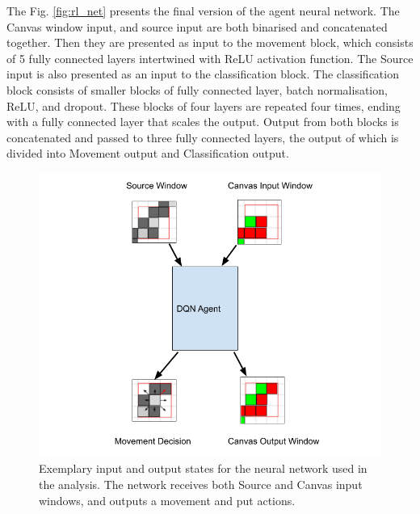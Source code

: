 The Fig. \ref{fig:rl_net} presents the final version of the agent neural network.
The Canvas window input, and source input are both binarised and concatenated together.
Then they are presented as input to the movement block, which consists of 5 fully connected layers intertwined with ReLU activation function.
The Source input is also presented as an input to the classification block.
The classification block consists of smaller blocks of fully connected layer, batch normalisation, ReLU, and dropout.
These blocks of four layers are repeated four times, ending with a fully connected layer that scales the output.
Output from both blocks is concatenated and passed to three fully connected layers, the output of which is divided into Movement output and Classification output.

\begin{figure}[ht]
  \centering
  \includegraphics[width=0.8\linewidth]{figures/chapter7/network_output_input.png}
  \caption{Exemplary input and output states for the neural network used in the analysis. The network receives both Source and Canvas input windows, and outputs a movement and put actions.}
  \label{fig:rl_inp_out}
\end{figure}


